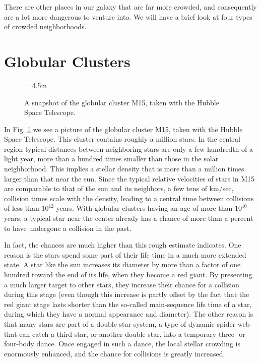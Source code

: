 There are other places in our galaxy that are far more crowded, and
consequently are a lot more dangerous to venture into.  We will have
a brief look at four types of crowded neighborhoods.

\section{Globular Clusters}

\begin{figure}[ht]
\begin{center}
\epsfxsize = 4.5in
\caption[A snapshot of the globular cluster M15]
{A snapshot of the globular cluster M15, taken with the Hubble Space
Telescope.}
\label{fig:m15}
\end{center}
\end{figure}

In Fig. \ref{fig:m15} we see a picture of the globular cluster M15,
taken with the Hubble Space Telescope.  This cluster contains roughly
a million stars.  In the central region typical distances between
neighboring stars are only a few hundredth of a light year, more than
a hundred times smaller than those in the solar neighborhood.  This
implies a stellar density that is more than a million times larger
than that near the sun.  Since the typical relative velocities of
stars in M15 are comparable to that of the sun and its neighbors, a
few tens of km/sec, collision times scale with the density, leading to
a central time between collisions of less than $10^{12}$ years.  With
globular clusters having an age of more than $10^{10}$ years, a typical
star near the center already has a chance of more than a percent to
have undergone a collision in the past.  

In fact, the chances are much higher than this rough estimate indicates.
One reason is the stars spend some part of their life time in a much
more extended state.  A star like the sun increases its diameter by
more than a factor of one hundred toward the end of its life, when
they become a red giant.  By presenting a much larger target to other
stars, they increase their chance for a collision during this stage
(even though this increase is partly offset by the fact that the red
giant stage lasts shorter than the so-called main-sequence life time
of a star, during which they have a normal appearance and diameter).
The other reason is that many stars are part of a double star system,
a type of dynamic spider web that can catch a third star, or another
double star, into a temporary three- or four-body dance.  Once engaged
in such a dance, the local stellar crowding is enormously enhanced,
and the chance for collisions is greatly increased. 

